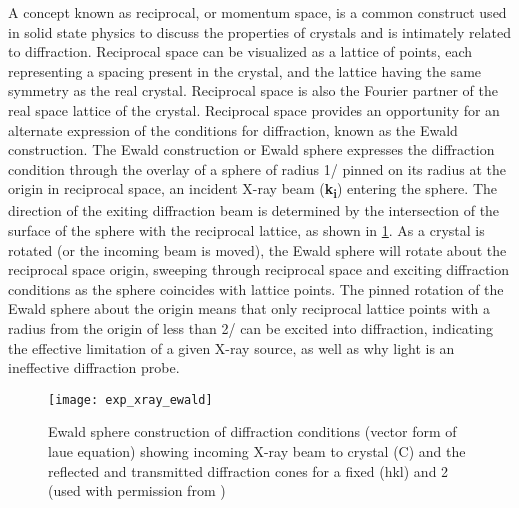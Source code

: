 A concept known as reciprocal, or momentum space, is a common construct used in solid state physics to discuss the properties of crystals and is intimately related to diffraction.
Reciprocal space can be visualized as a lattice of points, each representing a spacing present in the crystal, and the lattice having the same symmetry as the real crystal.
Reciprocal space is also the Fourier partner of the real space lattice of the crystal.
Reciprocal space provides an opportunity for an alternate expression of the conditions for diffraction, known as the Ewald construction.
The Ewald construction or Ewald sphere expresses the diffraction condition through the overlay of a sphere of radius 1/\textlambda{} pinned on its radius at the origin in reciprocal space, an incident X-ray beam (\textbf{k\textsubscript{i}}) entering the sphere.
The direction of the exiting diffraction beam is determined by the intersection of the surface of the sphere with the reciprocal lattice, as shown in \cref{fig:exp_xray_ewald}.
As a crystal is rotated (or the incoming beam is moved), the Ewald sphere will rotate about the reciprocal space origin, sweeping through reciprocal space and exciting diffraction conditions as the sphere coincides with lattice points.
The pinned rotation of the Ewald sphere about the origin means that only reciprocal lattice points with a radius from the origin of less than 2/\textlambda{} can be excited into diffraction, indicating the effective limitation of a given X-ray source, as well as why light is an ineffective diffraction probe.
\begin{figure}
 \centering \texttt{[image: exp\_xray\_ewald]}
 \caption[Ewald sphere]{\label{fig:exp_xray_ewald}Ewald sphere construction of diffraction conditions (vector form of laue equation) showing incoming X-ray beam to crystal (C) and the reflected and transmitted diffraction cones for a fixed (hkl) and 2\straighttheta{} (used with permission from \cite{He2009})}
\end{figure}

